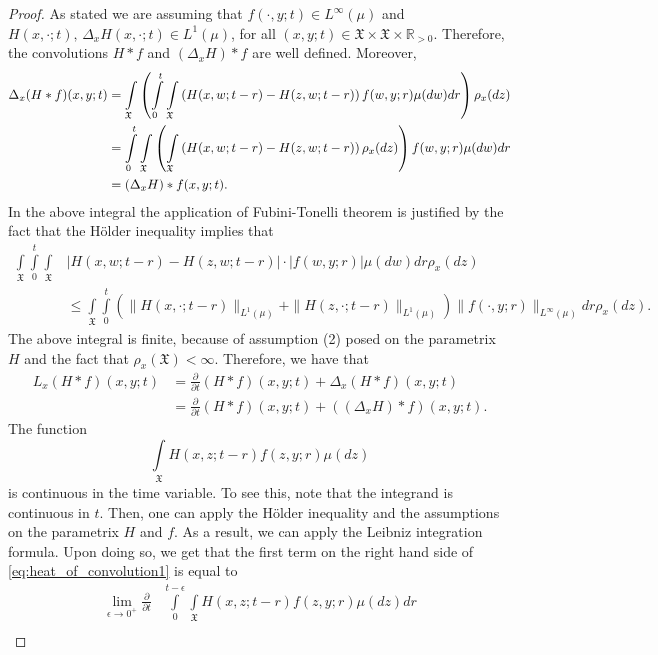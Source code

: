\documentclass[11pt,reqno]{amsart}
\theoremstyle{remark}
\theoremstyle{definition}
\numberwithin{theorem}{section} \numberwithin{equation}{section}
\newcommand{\X}{\mathfrak{X}}
\begin{document}
\begin{proof} As stated we are assuming that $f(\cdot, y;t)\in L^{\infty}(\mu)$ and $H(x,\cdot;t), \, \Delta_{x}H(x,\cdot;t)\in L^1(\mu)$,
for all $(x,y;t) \in \X\times \X \times \mathbb{R}_{>0}$.  Therefore, the convolutions $H\ast f$ and $(\Delta_{x}H)\ast f$ are well defined. Moreover,
\begin{align}\notag
\Delta_{x}(H\ast f)(x,y;t)&= \int\limits_{\X}\left(\int\limits _{0}^{t}\int\limits_{\X} \left(H(x,w;t-r) - H(z,w;t-r)\right)f(w,y;r)\mu(d w)dr\right)\rho_x(dz)
    \\ &= \int\limits _{0}^{t} \int\limits_{\X} \left(\int\limits_{\X} \left(H(x,w;t-r) - H(z,w;t-r)\right)\rho_x(dz)\right) f(w,y;r)\mu( dw)  dr \notag\\
    &= (\Delta_{x}H)\ast f (x,y;t).\label{eq. change of delta and ast}
\end{align}
In the above integral the application of Fubini-Tonelli theorem is justified by the fact that the H\"older inequality implies that
\begin{align*}
\int\limits_{\X}\int\limits _{0}^{t}\int\limits_{\X} &\left|H(x,w;t-r) - H(z,w;t-r)\right|\cdot |f(w,y;r)|\mu( dw)dr\rho_x(dz) \\ & \leq \int\limits_{\X}\int\limits _{0}^{t} \left(\| H(x,\cdot;t-r)\|_{L^1(\mu)}+ \| H(z,\cdot;t-r)\|_{L^1(\mu)}\right)  \| f(\cdot,y;r)\|_{L^\infty(\mu)}dr\rho_x(dz).
\end{align*}
The above integral is finite, because of assumption (2) posed on the parametrix $H$ and the fact that $\rho_x(\X)<\infty$.
Therefore, we have that
\begin{align}\label{eq:heat_of_convolution1}
L_{x}(H\ast f)(x,y;t)&=
    \frac{\partial}{\partial t}(H\ast f)(x,y;t)
    + \Delta_{x}(H\ast f)(x,y;t)\\ &=
  \frac{\partial}{\partial t}(H\ast f)(x,y;t)+  \left( (\Delta_{x}H)\ast f\right)(x,y;t)\nonumber.%
\end{align}
The function
$$
\int\limits_{\X}H(x,z;t-r)f(z,y;r) \mu(dz)
$$
is continuous in the time variable.  To see this, note that the integrand is continuous in $t$. Then, one can apply
the H\"older inequality and the assumptions on the parametrix $H$ and $f$.
As a result, we can apply the
Leibniz integration formula.  Upon doing so, we get that
the first term on the right hand side of \eqref{eq:heat_of_convolution1} is equal to
\begin{align} \label{eq.deriv in t1}
\lim_{\epsilon\to0^+}\frac{\partial}{\partial t}&\int\limits _{0}^{t-\epsilon}\int\limits_{\X} H(x,z;t-r)f(z,y;r) \mu(dz)dr\\&

\end{align}
\end{proof}
\end{document}
